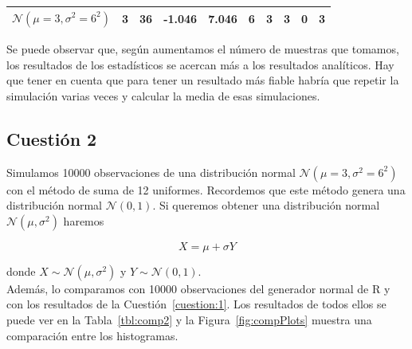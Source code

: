 \documentclass[12pt,a4paper,twoside,openright,titlepage,final]{article}
\begin{document}
\begin{table}[htbp!]
{\begin{tabular}{@{}cccccccccc@{}}
$\mathcal{N}(\mu = 3, \sigma^2 = 6 ^2)$                                                              & 3              & 36                & -1.046      & 7.046       & 6                                                                    & 3             & 3                 & 0                  & 3                \\ \bottomrule
\end{tabular}%
}
\end{table}

Se puede observar que, según aumentamos el número de muestras que tomamos, los resultados de los estadísticos se acercan más a los resultados analíticos. Hay que tener en cuenta que para tener un resultado más fiable habría que repetir la simulación varias veces y calcular la media de esas simulaciones.


\subsection{Cuestión 2}

Simulamos 10000 observaciones de una distribución normal $\mathcal{N}(\mu = 3, \sigma^2 = 6^2)$ con el método de suma de 12 uniformes. Recordemos que este método genera una distribución normal $\mathcal{N}(0,1)$. Si queremos obtener una distribución normal $\mathcal{N}(\mu, \sigma^2)$ haremos

\[ X = \mu + \sigma Y \]

donde $X \sim \mathcal{N}(\mu, \sigma^2)$ y $Y \sim \mathcal{N}(0,1)$.\\

Además, lo comparamos con 10000 observaciones del generador normal de R y con los resultados de la Cuestión~\ref{cuestion:1}. Los resultados de todos ellos se puede ver en la Tabla~\ref{tbl:comp2} y la Figura~\ref{fig:compPlots} muestra una comparación entre los histogramas.\\
\end{document}
